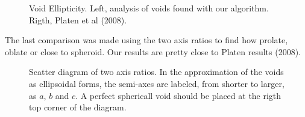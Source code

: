 \documentclass[preprint]{aastex62}
\begin{document}
\begin{figure}
  \caption{Void Ellipticity. Left, analysis of voids found with our algorithm.
    Rigth, Platen et al (2008).
    \label{fig:ellipticity}}
\end{figure}

The last comparison was made using the two axis ratios to find how prolate, oblate or close
to spheroid. Our results are pretty close to Platen results (2008).

\begin{figure}
  \caption{Scatter diagram of two axis ratios. In the approximation of the voids
    as ellipsoidal forms, the semi-axes are labeled, from shorter to larger, as
    $a$, $b$ and $c$. A perfect sphericall void should be placed at the rigth top
    corner of the diagram. 
    \label{fig:two_axis_ratios}}
\end{figure}
\end{document}
